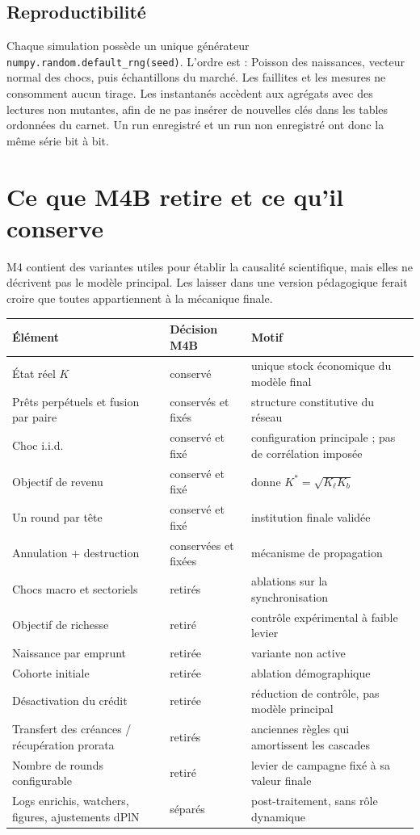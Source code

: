 \documentclass[11pt,a4paper]{article}
\newcommand{\code}[1]{\texttt{#1}}
\begin{document}
\subsection{Reproductibilité}

Chaque simulation possède un unique générateur
\code{numpy.random.default\_rng(seed)}. L'ordre est : Poisson des naissances,
vecteur normal des chocs, puis échantillons du marché. Les faillites et les
mesures ne consomment aucun tirage. Les instantanés accèdent aux agrégats avec
des lectures non mutantes, afin de ne pas insérer de nouvelles clés dans les
tables ordonnées du carnet. Un run enregistré et un run non enregistré ont
donc la même série bit à bit.

\section{Ce que M4B retire et ce qu'il conserve}

M4 contient des variantes utiles pour établir la causalité scientifique, mais
elles ne décrivent pas le modèle principal. Les laisser dans une version
pédagogique ferait croire que toutes appartiennent à la mécanique finale.

\begin{longtable}{p{}p{}p{}}
\toprule
Élément & Décision M4B & Motif \\
\midrule
\endhead
État réel $K$ & conservé & unique stock économique du modèle final \\
Prêts perpétuels et fusion par paire & conservés et fixés & structure
constitutive du réseau \\
Choc i.i.d. & conservé et fixé & configuration principale ; pas de
corrélation imposée \\
Objectif de revenu & conservé et fixé & donne $K^*=\sqrt{K_\ell K_b}$ \\
Un round par tête & conservé et fixé & institution finale validée \\
Annulation + destruction & conservées et fixées & mécanisme de propagation \\
Chocs macro et sectoriels & retirés & ablations sur la synchronisation \\
Objectif de richesse & retiré & contrôle expérimental à faible levier \\
Naissance par emprunt & retirée & variante non active \\
Cohorte initiale & retirée & ablation démographique \\
Désactivation du crédit & retirée & réduction de contrôle, pas modèle principal \\
Transfert des créances / récupération prorata & retirés & anciennes règles
qui amortissent les cascades \\
Nombre de rounds configurable & retiré & levier de campagne fixé à sa valeur
finale \\
Logs enrichis, watchers, figures, ajustements dPlN & séparés & post-traitement,
sans rôle dynamique \\
\bottomrule
\end{longtable}
\end{document}
